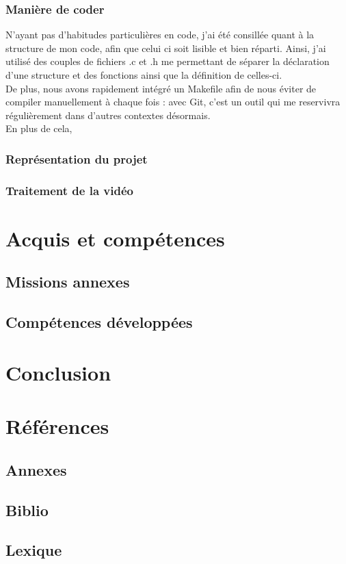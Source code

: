 \documentclass[11pt,french,a4paper]{report}
\begin{document}
        \subsection{Manière de coder}
N'ayant pas d'habitudes particulières en code, j'ai été consillée quant à la structure de mon code, afin que celui
ci soit lisible et bien réparti. Ainsi, j'ai utilisé des couples de fichiers .c et .h me permettant de séparer 
la déclaration d'une structure et des fonctions ainsi que la définition de celles-ci. \\ 
De plus, nous avons rapidement intégré un Makefile afin de nous éviter de compiler manuellement à chaque fois : 
avec Git, c'est un outil qui me reservivra régulièrement dans d'autres contextes désormais. \\
En plus de cela,
        \subsection{Représentation du projet}
        \subsection{Traitement de la vidéo}
    

\chapter{Acquis et compétences}
    \section{Missions annexes}
    \section{Compétences développées}

\chapter{Conclusion}

\chapter{Références}
    \section{Annexes}
    \section{Biblio}
    \section{Lexique}
\end{document}
